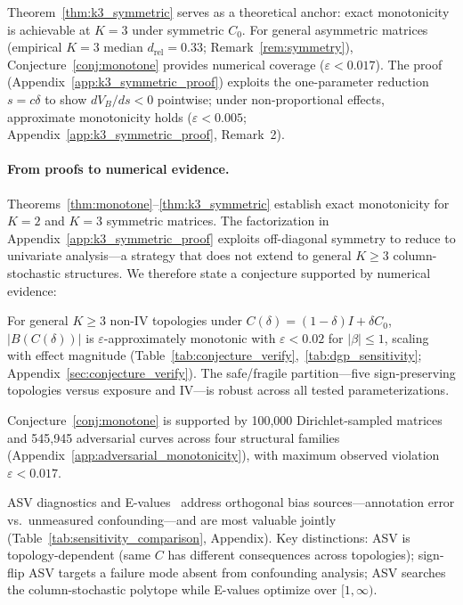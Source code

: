 Theorem~\ref{thm:k3_symmetric} serves as a theoretical anchor: exact monotonicity is achievable at $K{=}3$ under symmetric $C_0$. For general asymmetric matrices (empirical $K{=}3$ median $d_{\mathrm{rel}}{=}0.33$; Remark~\ref{rem:symmetry}), Conjecture~\ref{conj:monotone} provides numerical coverage ($\varepsilon < 0.017$). The proof (Appendix~\ref{app:k3_symmetric_proof}) exploits the one-parameter reduction $s = c\delta$ to show $dV_B/ds < 0$ pointwise; under non-proportional effects, approximate monotonicity holds ($\varepsilon < 0.005$; Appendix~\ref{app:k3_symmetric_proof}, Remark~2).

\paragraph{From proofs to numerical evidence.}
Theorems~\ref{thm:monotone}--\ref{thm:k3_symmetric} establish exact monotonicity for $K{=}2$ and $K{=}3$ symmetric matrices. The factorization in Appendix~\ref{app:k3_symmetric_proof} exploits off-diagonal symmetry to reduce to univariate analysis---a strategy that does not extend to general $K{\geq}3$ column-stochastic structures. We therefore state a conjecture supported by numerical evidence:

\begin{conjecture}
\label{conj:monotone}
For general $K{\geq}3$ non-IV topologies under $C(\delta) = (1{-}\delta)I + \delta C_0$, $|B(C(\delta))|$ is $\varepsilon$-approximately monotonic with $\varepsilon < 0.02$ for $|\beta| \leq 1$, scaling with effect magnitude (Table~\ref{tab:conjecture_verify},~\ref{tab:dgp_sensitivity}; Appendix~\ref{sec:conjecture_verify}). The safe/fragile partition---five sign-preserving topologies versus exposure and IV---is robust across all tested parameterizations.
\end{conjecture}

Conjecture~\ref{conj:monotone} is supported by 100{,}000 Dirichlet-sampled matrices and 545{,}945 adversarial curves across four structural families (Appendix~\ref{app:adversarial_monotonicity}), with maximum observed violation $\varepsilon < 0.017$.

\begin{remark}
\label{rem:evalue}
ASV diagnostics and E-values~\cite{vanderweele_ding2017} address orthogonal bias sources---annotation error vs.\ unmeasured confounding---and are most valuable jointly (Table~\ref{tab:sensitivity_comparison}, Appendix). Key distinctions: ASV is topology-dependent (same $C$ has different consequences across topologies); sign-flip ASV targets a failure mode absent from confounding analysis; ASV searches the column-stochastic polytope while E-values optimize over $[1,\infty)$.
\end{remark}

